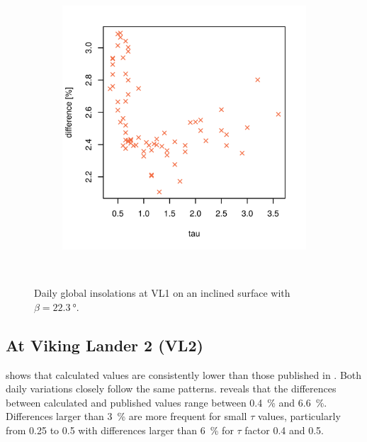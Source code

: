 \begin{figure}[h]
\begin{subfigure}[t]{\subfigureWidth}
            \includegraphics[height=\graphicsHeight]{sections/appendix/insolation-calculation-verification/plots/h-diff-bet-exp-calc-at-vl1-with-beta-223-deg.png}
            \label{fig:sub:comparative-global-insolation-at-vl1-beta-equals-phi-percentage-differences}
    \end{subfigure}\\[0.8ex]
    \caption[Daily global insolations at Viking Lander 1 on an inclined surface with $\beta=\SI{22.3}{\degree}$]
    {Daily global insolations at \ac{VL1} on an inclined surface with $\beta=\SI{22.3}{\degree}$.}
    \label{fig:plot:comparative-global-insolation-at-vl1-beta-equals-phi}
\vspace{-2ex}
\end{figure}

\subsection{At Viking Lander 2 (VL2)}
 shows that calculated values are consistently lower than those published in . Both daily variations closely follow the same patterns.  reveals that the differences between calculated and published values range between \SI{0.4}{\percent} and \SI{6.6}{\percent}. Differences larger than \SI{3}{\percent} are more frequent for small $\tau$ values, particularly from 0.25 to 0.5 with differences larger than \SI{6}{\percent} for $\tau$ factor 0.4 and 0.5.

